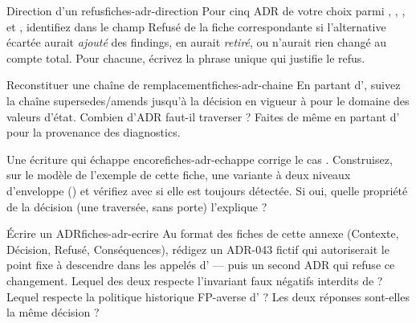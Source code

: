 \begin{exercice}{Direction d'un refus}{fiches-adr-direction}
Pour cinq ADR de votre choix parmi , , ,  et
, identifiez dans le champ \og Refusé\fg{} de la fiche correspondante
si l'alternative écartée aurait \emph{ajouté} des findings, en aurait
\emph{retiré}, ou n'aurait rien changé au compte total. Pour chacune, écrivez
la phrase unique qui justifie le refus.
\end{exercice}

\begin{exercice}{Reconstituer une chaîne de remplacement}{fiches-adr-chaine}
En partant d', suivez la chaîne \og supersedes\fg{}/\og amends\fg{}
jusqu'à la décision en vigueur à \code{\snapshotCommit} pour le domaine des
valeurs d'état. Combien d'ADR faut-il traverser ? Faites de même en partant
d' pour la provenance des diagnostics.
\end{exercice}

\begin{exercice}{Une écriture qui échappe encore}{fiches-adr-echappe}
 corrige le cas . Construisez, sur le modèle de
l'exemple de cette fiche, une variante à deux niveaux d'enveloppe
() et vérifiez avec
 si elle est toujours détectée. Si oui, quelle
propriété de la décision (\og une traversée, sans porte\fg{}) l'explique ?
\end{exercice}

\begin{exercice}{Écrire un ADR}{fiches-adr-ecrire}
Au format des fiches de cette annexe (Contexte, Décision, Refusé,
Conséquences), rédigez un ADR-043 fictif qui autoriserait le point fixe à
descendre dans les appelés  d' --- puis un second ADR qui
refuse ce changement. Lequel des deux respecte l'invariant \og faux négatifs
interdits\fg{} de  ? Lequel respecte la politique historique
\og FP-averse\fg{} d' ? Les deux réponses sont-elles la même décision ?
\end{exercice}
